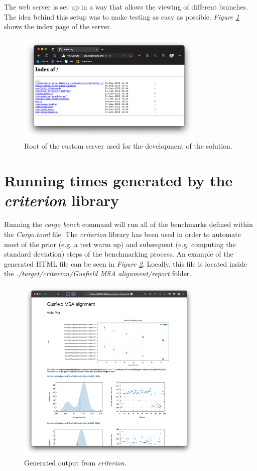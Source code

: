 \documentclass[twoside,openright,titlepage,numbers=noenddot,headinclude,%
                footinclude=true,cleardoublepage=empty,abstractoff, %
                BCOR=5mm,paper=a4,fontsize=11pt,%
                ngerman,american,%
                ]{scrreprt}
\begin{document}
The web server is set up in a way that allows the viewing of different branches. The idea behind this setup was to make testing as easy as possible. \textit{Figure \ref{fig:ci-branch-index}} shows the index page of the server.

\begin{figure}[h]
\includegraphics[width=0.8\textwidth]{report/ci-branch-index.png}
\centering
\caption{Root of the custom server used for the development of the solution.}
\label{fig:ci-branch-index}
\end{figure}

\FloatBarrier

\section{Running times generated by the \textit{criterion} library}
\label{sec:criterion}
Running the \textit{cargo bench} command will run all of the benchmarks defined within the \textit{Cargo.toml} file. The \textit{criterion} library has been used in order to automate most of the prior (e.g. a test warm up) and subsequent (e.g. computing the standard deviation) steps of the benchmarking process. An example of the generated HTML file can be seen in \textit{Figure \ref{fig:criterion}}. Locally, this file is located inside the \textit{./target/criterion/Gusfield MSA alignment/report} folder.

\begin{figure}[h]
\includegraphics[width=0.8\textwidth]{report/criterion.png}
\centering
\caption{Generated output from \textit{criterion}.}
\label{fig:criterion}
\end{figure}
\end{document}
